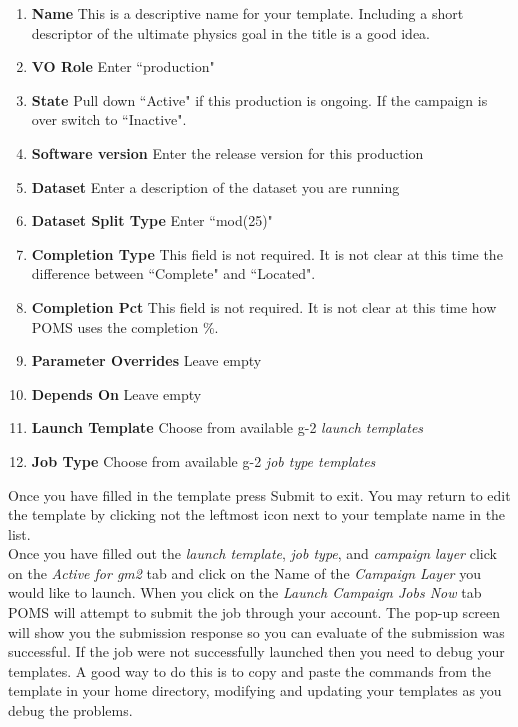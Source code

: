 \begin{enumerate}
\item[]{\bf{Name}} This is a descriptive name for your template. Including a short descriptor of the ultimate physics goal in the title is a good idea.
\item[]{\bf{VO Role}} Enter ``production"
\item[]{\bf{State}} Pull down ``Active" if this production is ongoing. If the campaign is over switch to ``Inactive".
\item[]{\bf{Software version}} Enter the release version for this production
\item[]{\bf{Dataset}} Enter a description of the dataset you are running
\item[]{\bf{Dataset Split Type}} Enter ``mod(25)"
\item[]{\bf{Completion Type}}  This field is not required. It is not clear at this time the difference between ``Complete" and ``Located".
\item[]{\bf{Completion Pct}} This field is not required. It is not clear at this time how POMS uses the completion $\%$.
\item[]{\bf{Parameter Overrides}} Leave empty
\item[]{\bf{Depends On}} Leave empty
\item[]{\bf{Launch Template}} Choose from available g-2 {\it {launch templates}}
\item[]{\bf{Job Type}} Choose from available g-2 {\it {job type templates}}
\end{enumerate}

\noindent Once you have filled in the template press Submit to exit. You may return to edit the template by clicking not the leftmost icon next to your template name in the list.\\

\noindent Once you have filled out the  {\it{launch template}}, {\it{job type}}, and {\it{campaign layer}} click on the {\it{Active for gm2}}  tab and click on the Name of the {\it{Campaign Layer}} you would like to launch. When you click on the {\it{Launch Campaign Jobs Now}} tab POMS will attempt to submit the job through your account. The pop-up screen will show you the submission response so you can evaluate of the submission was successful. If the job were not successfully launched then you need to debug your templates. A good way to do this is to copy and paste the commands from the template in your home directory, modifying and updating your templates as you debug the problems.  

